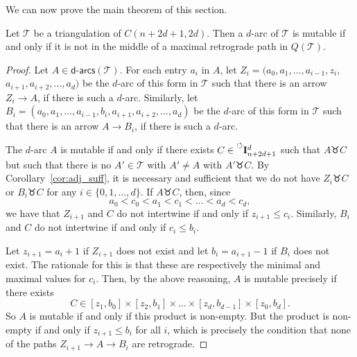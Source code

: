 \documentclass[ALCO,Unicode,published]{cedram}
\newcommand{\nonconsec}[2]{\prescript{\circlearrowleft}{}{\mathbf{I}_{#1}^{#2}}}
\newcommand{\darcs}[1]{\mathsf{d}\text{-}\mathsf{arcs}(#1)} %
\newcommand{\swr}{\taurus} %
\begin{document}
We can now prove the main theorem of this section.

\begin{theorem}\label{thm:retro}
Let $\mathcal{T}$ be a triangulation of $C(n + 2d + 1, 2d)$. Then a $d$-arc of $\mathcal{T}$ is mutable if and only if it is not in the middle of a maximal retrograde path in $Q(\mathcal{T})$.
\end{theorem}
\begin{proof}
Let $A \in \darcs{\mathcal{T}}$. For each entry $a_{i}$ in $A$, let $Z_{i} = (a_{0}, a_{1}, \dots, a_{i-1}, z_{i},$ $a_{i+1}, a_{i + 2}, \dots, a_{d})$ be the $d$-arc of this form in $\mathcal{T}$ such that there is an arrow $Z_{i} \rightarrow A$, if there is such a $d$-arc. Similarly, let $B_{i} = (a_{0}, a_{1}, \dots, a_{i-1}, b_{i}, a_{i + 1}, a_{i + 2}, \dots, a_{d})$ be the $d$-arc of this form in $\mathcal{T}$ such that there is an arrow $A \rightarrow B_{i}$, if there is such a $d$-arc.

The $d$-arc $A$ is mutable if and only if there exists $C \in \nonconsec{n+2d+1}{d}$ such that $A \swr C$ but such that there is no $A' \in \mathcal{T}$ with $A' \neq A$ with $A' \swr C$. By Corollary~\ref{cor:adj_suff}, it is necessary and sufficient that we do not have $Z_{i} \swr C$ or $B_{i} \swr C$ for any $i \in \{0 , 1, \dots, d \}$. If $A \swr C$, then, since \[a_{0} < c_{0} < a_{1} < c_{1} < \dots < a_{d} < c_{d},\] we have that $Z_{i + 1}$ and $C$ do not intertwine if and only if $z_{i + 1} \leqslant c_{i}$. Similarly, $B_{i}$ and $C$ do not intertwine if and only if $c_{i} \leqslant b_{i}$.

Let $z_{i + 1} = a_{i} + 1$ if $Z_{i + 1}$ does not exist and let $b_{i} = a_{i + 1} - 1$ if $B_{i}$ does not exist. The rationale for this is that these are respectively the minimal and maximal values for $c_{i}$. Then, by the above reasoning, $A$ is mutable precisely if there exists \[C \in [z_{1}, b_{0}] \times [z_{2}, b_{1}] \times \dots \times [z_{d}, b_{d - 1}] \times [z_{0},b_{d}] .\] So $A$ is mutable if and only if this product is non-empty. But the product is non-empty if and only if $z_{i + 1} \leqslant b_{i}$ for all $i$, which is precisely the condition that none of the paths $Z_{i + 1} \rightarrow A \rightarrow B_{i}$ are retrograde.
\end{proof}
\end{document}
